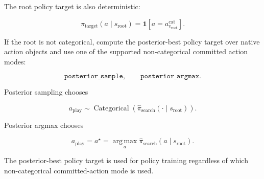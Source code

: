 \documentclass[11pt]{article}
\newcommand{\one}{\mathbf{1}}
\newcommand{\Cat}{\operatorname{Categorical}}
\newcommand{\argmax}{\operatorname*{arg\,max}}
\begin{document}
The root policy target is also deterministic:

\[
\pi_{\mathrm{target}}(a\mid s_{\mathrm{root}})
=
\one[a=a_{v_{\mathrm{root}}}^{\mathrm{cat}}].
\]

If the root is not categorical, compute the posterior-best policy target over
native action objects and use one of the supported non-categorical committed
action modes:

\[
\texttt{posterior\_sample},
\qquad
\texttt{posterior\_argmax}.
\]

Posterior sampling chooses

\[
a_{\mathrm{play}}
\sim
\Cat
\left(
\hat{\pi}_{\mathrm{search}}(\cdot\mid s_{\mathrm{root}})
\right).
\]

Posterior argmax chooses

\[
a_{\mathrm{play}}
=
a^\star
=
\argmax_a
\hat\pi_{\mathrm{search}}(a\mid s_{\mathrm{root}}).
\]

The posterior-best policy target is used for policy training regardless of which
non-categorical committed-action mode is used.
\end{document}
